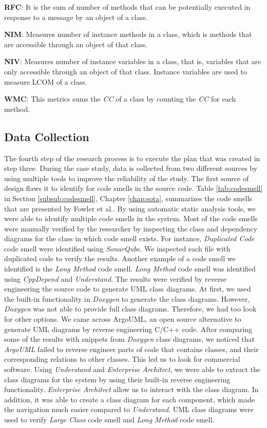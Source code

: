 \textbf{RFC}: It is the sum of number of methods that can be potentially executed in response to a message by an object of a class.

\textbf{NIM}: Measures number of instance methods in a class, which is methods that are accessible through an object of that class. 

\textbf{NIV}: Measures number of instance variables in a class, that is, variables that are only accessible through an object of that class. Instance variables are used to measure LCOM of a class. 

\textbf{WMC}: This metrics sums the \textit{CC} of a class by counting the \textit{CC} for each method.



\subsection{Data Collection}
The fourth step of the research process is to execute the plan that was created in step three. During the case study, data is collected from two different sources by using multiple tools to improve the reliability of the study. The first source of design flaws it to identify for code smells in the source code. Table \ref{tab:codesmell} in Section \ref{subsub:codesmell}, Chapter \ref{chap:sota}, summarizes the code smells that are presented by Fowler et al.\cite{fowler1999refactoring}. By using automatic static analysis tools, we were able to identify multiple code smells in the system. Most of the code smells were manually verified by the researcher by inspecting the class and dependency diagrams for the class in which code smell exists. For instance, \textit{Duplicated Code} code smell were identified using \textit{SonarQube}. We inspected each file with duplicated code to verify the results. Another example of a code smell we identified is the \textit{Long Method} code smell. \textit{Long Method} code smell was identified using \textit{CppDepend} and \textit{Understand}. The results were verified by reverse engineering the source code to generate UML class diagrams. At first, we used the built-in functionality in \textit{Doxygen} to generate the class diagrams. However, \textit{Doxygen} was not able to provide full class diagrams. Therefore, we had too look for other options. We came across ArgoUML, an open source alternative to generate UML diagrams by reverse engineering C/C++ code. After comparing some of the results with snippets from \textit{Doxygen} class diagrams, we noticed that \textit{ArgoUML} failed to reverse engineer parts of code that contains classes, and their corresponding relations to other classes. This led us to look for commercial software. Using \textit{Understand} and \textit{Enterprise Architect}, we were able to extract the class diagrams for the system by using their built-in reverse engineering functionality. \textit{Enterprise Architect} allow us to interact with the class diagram. In addition, it was able to create a class diagram for each component, which made the navigation much easier compared to \textit{Understand}. UML class diagrams were used to verify \textit{Large Class} code smell and \textit{Long Method} code smell.

